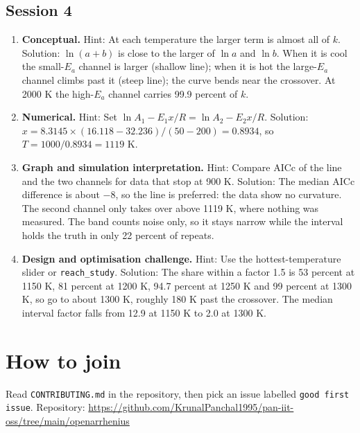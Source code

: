 \documentclass[11pt,a4paper]{article}
\begin{document}
\subsection*{Session 4}
\begin{enumerate}[nosep]
\item \textbf{Conceptual.} Hint: At each temperature the larger term is almost all of $k$. Solution: $\ln(a+b)$ is close to the larger of $\ln a$ and $\ln b$. When it is cool the small-$E_a$ channel is larger (shallow line); when it is hot the large-$E_a$ channel climbs past it (steep line); the curve bends near the crossover. At 2000 K the high-$E_a$ channel carries 99.9 percent of $k$.
\item \textbf{Numerical.} Hint: Set $\ln A_1-E_1x/R=\ln A_2-E_2x/R$. Solution: $x=8.3145\times(16.118-32.236)/(50-200)=0.8934$, so $T=1000/0.8934=1119$ K.
\item \textbf{Graph and simulation interpretation.} Hint: Compare AICc of the line and the two channels for data that stop at 900 K. Solution: The median AICc difference is about $-8$, so the line is preferred: the data show no curvature. The second channel only takes over above 1119 K, where nothing was measured. The band counts noise only, so it stays narrow while the interval holds the truth in only 22 percent of repeats.
\item \textbf{Design and optimisation challenge.} Hint: Use the hottest-temperature slider or \texttt{reach\_study}. Solution: The share within a factor 1.5 is 53 percent at 1150 K, 81 percent at 1200 K, 94.7 percent at 1250 K and 99 percent at 1300 K, so go to about 1300 K, roughly 180 K past the crossover. The median interval factor falls from 12.9 at 1150 K to 2.0 at 1300 K.
\end{enumerate}

\section{How to join}
Read \texttt{CONTRIBUTING.md} in the repository, then pick an issue labelled \texttt{good first issue}. Repository: \url{https://github.com/KrunalPanchal1995/pan-iit-oss/tree/main/openarrhenius}
\end{document}
